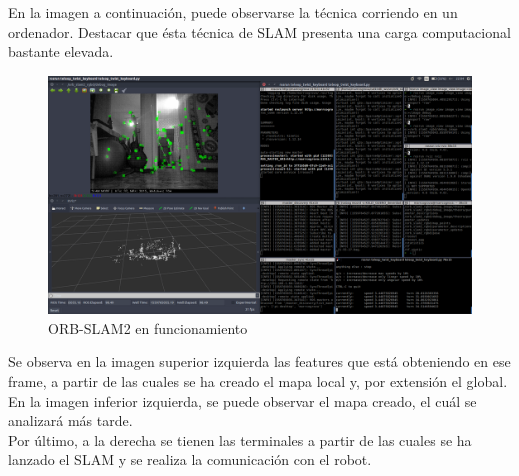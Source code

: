 En la imagen a continuación, puede observarse la técnica corriendo en un ordenador. Destacar que ésta técnica de SLAM presenta una carga computacional bastante elevada.
\begin{figure}[h!]
    \centering
    \includegraphics[width=1\textwidth]{images/working_zone_orb}
    \caption{ORB-SLAM2 en funcionamiento}
\end{figure}

Se observa en la imagen superior izquierda las features que está obteniendo en ese frame, a partir de las cuales se ha creado el mapa local y,
por extensión el global. En la imagen inferior izquierda, se puede observar el mapa creado, el cuál se analizará más tarde.\\
Por último, a la derecha se tienen las terminales a partir de las cuales se ha lanzado el SLAM y se realiza la comunicación con el robot.\\

\newpage

